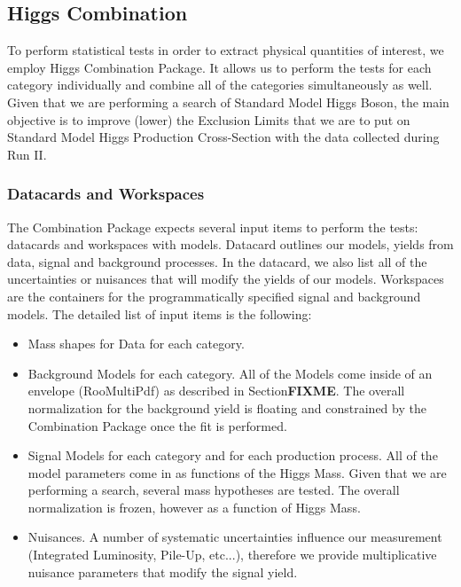 \subsection{Higgs Combination} \label{subsection:higgs_analysis_signal}
%
%
To perform statistical tests in order to extract physical quantities of interest, we employ Higgs Combination Package. It allows us to perform the tests for each category individually and combine all of the categories simultaneously as well. Given that we are performing a search of Standard Model Higgs Boson, the main objective is to improve (lower) the Exclusion Limits that we are to put on Standard Model Higgs Production Cross-Section with the data collected during Run II.

\subsubsection{Datacards and Workspaces}
The Combination Package expects several input items to perform the tests: datacards and workspaces with models. Datacard outlines our models, yields from data, signal and background processes. In the datacard, we also list all of the uncertainties or nuisances that will modify the yields of our models. Workspaces are the containers for the programmatically specified signal and background models. The detailed list of input items is the following:

\begin{itemize}
    \item Mass shapes for Data for each category.
    \item Background Models for each category. All of the Models come inside of an envelope (RooMultiPdf) as described in Section\textbf{FIXME}. The overall normalization for the background yield is floating and constrained by the Combination Package once the fit is performed.
    \item Signal Models for each category and for each production process. All of the model parameters come in as functions of the Higgs Mass. Given that we are performing a search, several mass hypotheses are tested. The overall normalization is frozen, however as a function of Higgs Mass.
    \item Nuisances. A number of systematic uncertainties influence our measurement (Integrated Luminosity, Pile-Up, etc...), therefore we provide multiplicative nuisance parameters that modify the signal yield.
\end{itemize}

